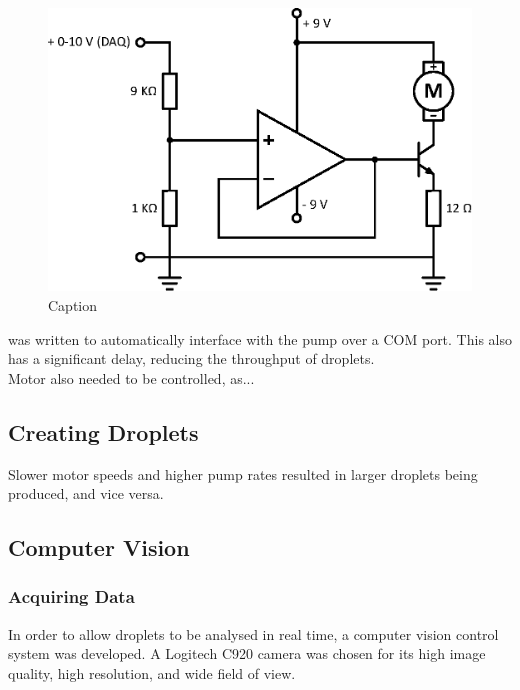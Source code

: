 \documentclass{physics_article_B}
\begin{document}
    \begin{figure}[H]
        \centering
        \includegraphics{Figures/MotorCircuit.eps}
        \caption{Caption}
        \label{fig:MotorCircuit}
    \end{figure}
    
     was written to automatically interface with the pump over a COM port. This also has a significant delay, reducing the throughput of droplets.\\
    
    Motor also needed to be controlled, as...
    
    \subsection{Creating Droplets}
    Slower motor speeds and higher pump rates resulted in larger droplets being produced, and vice versa.
    \subsection{Computer Vision\label{sect_vision}}
        
        \subsubsection{Acquiring Data}
        In order to allow droplets to be analysed in real time, a computer vision control system was developed. A Logitech C920 camera was chosen for its high image quality, high resolution, and wide field of view. \\
        
\end{document}
